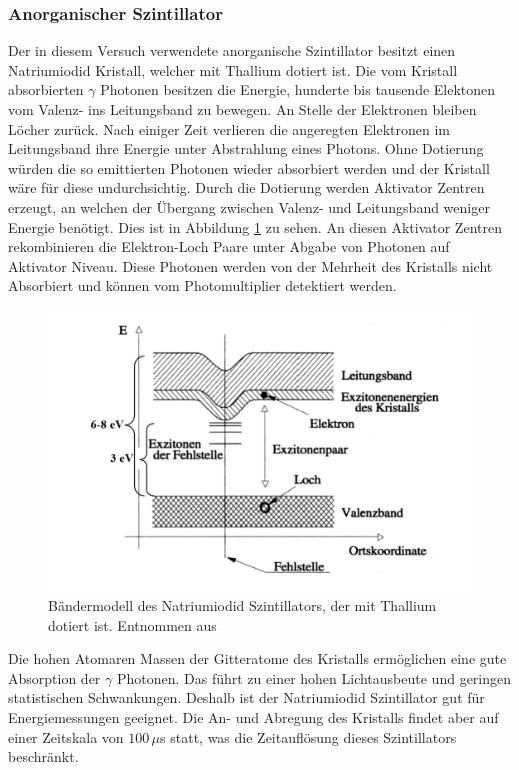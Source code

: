 \subsubsection{Anorganischer Szintillator}
Der in diesem Versuch verwendete anorganische Szintillator besitzt einen Natriumiodid Kristall, welcher mit Thallium dotiert ist.
Die vom Kristall absorbierten $\gamma$ Photonen besitzen die Energie, hunderte bis tausende Elektonen vom Valenz- ins Leitungsband  zu bewegen. An Stelle der Elektronen bleiben Löcher zurück. 
Nach einiger Zeit verlieren die angeregten Elektronen im Leitungsband ihre Energie unter Abstrahlung eines Photons. Ohne Dotierung würden die so emittierten Photonen wieder absorbiert werden  und der Kristall wäre für diese undurchsichtig. 
Durch die Dotierung werden Aktivator Zentren erzeugt, an welchen der Übergang zwischen Valenz- und Leitungsband weniger Energie benötigt. Dies ist in Abbildung \ref{bänder_NaJ} zu sehen.  An diesen Aktivator Zentren rekombinieren die Elektron-Loch Paare unter Abgabe von Photonen auf Aktivator Niveau. Diese Photonen werden von der Mehrheit des Kristalls nicht Absorbiert und können vom Photomultiplier detektiert werden.\\

\begin{figure}
	\centering
	\includegraphics[scale=0.7]{Bilder/baendermodell}
	\caption[Bändermodell in dotiertem NaJ]{\small Bändermodell des Natriumiodid Szintillators, der mit Thallium dotiert ist. Entnommen aus \cite{staatsex_szinti}}
	\label{bänder_NaJ}
\end{figure}
Die hohen Atomaren Massen der Gitteratome des Kristalls ermöglichen eine gute Absorption der $\gamma$ Photonen. Das führt zu einer hohen Lichtausbeute und geringen statistischen Schwankungen. Deshalb ist der Natriumiodid Szintillator gut für Energiemessungen geeignet. Die An- und Abregung des Kristalls findet aber auf einer Zeitskala von $100\,\mu$s statt, was die Zeitauflösung dieses Szintillators beschränkt. 

